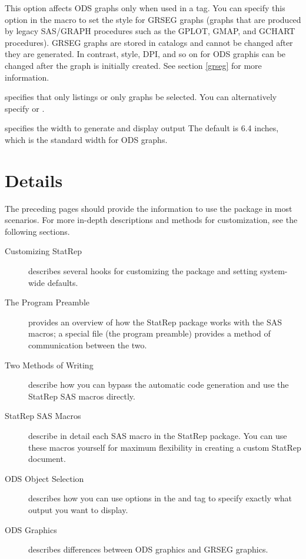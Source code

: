 \documentclass[article,oneside]{memoir}
\newcommand*{\StatRep}{\textsf{StatRep}\xspace}
\begin{document}
\begin{description}
    This option affects ODS graphs only when used in a  tag.
    You can specify this option in the  macro to set the style
    for GRSEG graphs (graphs that are produced by legacy SAS/GRAPH
    procedures such as the GPLOT, GMAP, and GCHART procedures).
    GRSEG graphs are stored in catalogs
    and cannot be changed after they are generated. In contrast,
    style, DPI, and so on for ODS graphis can be changed after the graph is initially created.
    See section \ref{grseg} for more information.

 \item[\Code{type=\emph{listing}|\emph{graph}}] specifies that only listings or
  only graphs be selected.
  You can alternatively specify  or .
      \item[\Code{width=}] specifies the width to generate and display  output
           The default is 6.4 inches, which is the standard width for ODS graphs.

  \end{description}



\chapter{Details}

The preceding pages should provide the information to use the package
in most scenarios. For more in-depth descriptions and methods for
customization, see the following sections.

\begin{description}
\item[Customizing \StatRep] describes several hooks for customizing
the package and setting system-wide defaults.
\item[The Program Preamble] provides an overview of how the \StatRep
package works with the SAS macros; a special file (the program preamble)
provides a method of communication between the two.
\item[Two Methods of Writing] describe how you can bypass the automatic
code generation and use the \StatRep SAS macros directly.
\item[\StatRep SAS Macros] describe in detail each SAS macro in the
\StatRep package. You can use these macros yourself for maximum flexibility
in creating a custom \StatRep document.
\item[ODS Object Selection] describes how you can use options in the
 and  tag to specify exactly what output you want
to display.
\item[ODS Graphics] describes differences between ODS graphics and
GRSEG graphics.
\end{description}
\end{document}
